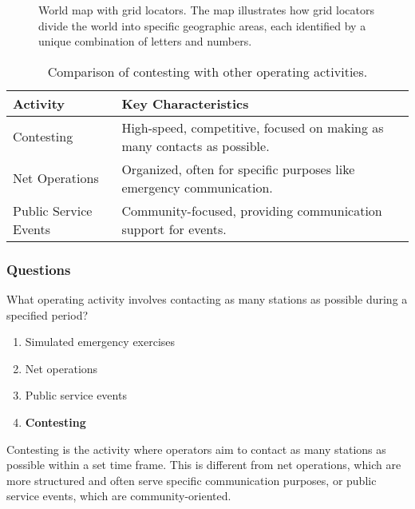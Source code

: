 \begin{figure}[h]
    \centering
    \caption{World map with grid locators. The map illustrates how grid locators divide the world into specific geographic areas, each identified by a unique combination of letters and numbers.}
    \label{fig:grid-locator-map}
\end{figure}

\begin{table}[h]
    \centering
    \begin{tabular}{|l|l|}
        \hline
        \textbf{Activity} & \textbf{Key Characteristics} \\
        \hline
        Contesting & High-speed, competitive, focused on making as many contacts as possible. \\
        Net Operations & Organized, often for specific purposes like emergency communication. \\
        Public Service Events & Community-focused, providing communication support for events. \\
        \hline
    \end{tabular}
    \caption{Comparison of contesting with other operating activities.}
    \label{tab:contesting-comparison}
\end{table}

\subsubsection*{Questions}

\begin{tcolorbox}[colback=gray!10!white,colframe=black!75!black,title={T8C03}]
    What operating activity involves contacting as many stations as possible during a specified period?
    \begin{enumerate}[label=\Alph*),noitemsep]
        \item Simulated emergency exercises
        \item Net operations
        \item Public service events
        \item \textbf{Contesting}
    \end{enumerate}
\end{tcolorbox}
Contesting is the activity where operators aim to contact as many stations as possible within a set time frame. This is different from net operations, which are more structured and often serve specific communication purposes, or public service events, which are community-oriented.

